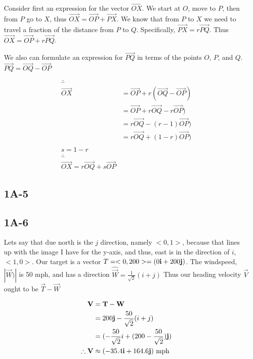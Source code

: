 \documentclass[main.tex]{subfiles}
\begin{document}
    Consider first an expression for the vector $\vec{OX}$.
    We start at $O$, move to $P$, then from $P$ go to $X$,
    thus $\vec{OX} = \vec{OP} + \vec{PX}$.
    We know that from $P$ to $X$ we need to travel a fraction of the
    distance from $P$ to $Q$. Specifically, $\vec{PX} = r\vec{PQ}$.
    Thus $\vec{OX} = \vec{OP} + r\vec{PQ}$.

    We also can formulate an expression for $\vec{PQ}$ in terms
    of the points $O$, $P$, and $Q$. $\vec{PQ} = \vec{OQ} - \vec{OP}$


    \begin{align*}
    \therefore\\
        \vec{OX} &= \vec{OP} + r(\vec{OQ} - \vec{OP})\\
        &= \vec{OP} + r\vec{OQ} - r\vec{OP})\\
        &= r\vec{OQ} - (r-1)\vec{OP})\\
        &= r\vec{OQ} + (1-r)\vec{OP})\\
        \\
        s = 1 - r\\
        \therefore\\
        \vec{OX} = r\vec{OQ} + s\vec{OP}
    \end{align*}

\subsection*{1A-5}

\subsection*{1A-6}

Lets say that due north is the $j$ direction, namely $<0,1>$,
because that lines up with the image I have for the y-axis, and
thus, east is in the direction of $i$, $<1,0>$.
Our target is a vector $T = <0, 200> = (0\mathbf{i} + 200\mathbf{j})$.
The windspeed, $|\vec{W})|$ is 50 mph, and has a direction $\hat{\vec
{W}} = \frac{1}{\sqrt{2}}(i + j)$
Thus our heading velocity $\vec{V}$ ought to be $\vec{T} - \vec{W}$

\begin{align}
\mathbf{V} &= \mathbf{T} - \mathbf{W}\\
&= 200\mathbf{j} - \frac{50}{\sqrt{2}}(i+j)\\
&= (- \frac{50}{\sqrt{2}}i + (200  - \frac{50}{\sqrt{2}}) \mathbf{j})\\
\therefore \mathbf{V} &\approx (- 35.4 \mathbf{i} + 164.6 \mathbf{j})\ \text{mph}
\end{align}
\end{document}

